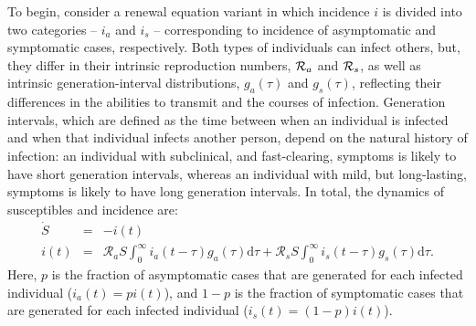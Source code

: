To begin, consider a renewal equation variant in which incidence $i$ is divided into two categories -- $i_a$ and $i_s$ -- corresponding to incidence of asymptomatic and symptomatic cases, respectively. 
Both types of individuals can infect others, but, they differ in their intrinsic reproduction numbers, ${\cal{R}}_a$ and ${\cal{R}}_s$, as well as intrinsic generation-interval distributions, $g_a(\tau)$ and $g_s(\tau)$, reflecting their differences in the abilities to transmit and the courses of infection.
Generation intervals, which are defined as the time between when an individual is infected and when that individual infects another person, depend on the natural history of infection:
an individual with subclinical, and fast-clearing, symptoms is likely to have short generation intervals, whereas an individual with mild, but long-lasting, symptoms is likely to have long generation intervals.
In total, the dynamics of susceptibles and incidence are:
\begin{eqnarray}
\dot{S}&=&-i(t) \\
i(t)&=&\mathcal R_a S \int_0^\infty i_a(t-\tau) g_a(\tau) \mathrm{d}\tau + \mathcal R_s S \int_0^\infty i_s(t-\tau) g_s(\tau) \mathrm{d}\tau.
\end{eqnarray}
Here, $p$ is the fraction of asymptomatic cases that are generated for each infected individual ($i_a(t)= p i(t)$), and $1-p$ is the fraction of symptomatic cases that are generated for each infected individual ($i_s(t)= (1-p) i(t)$).


